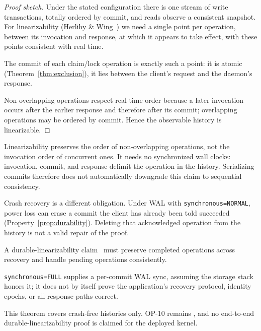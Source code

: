 \documentclass[11pt,a4paper]{article}
\theoremstyle{definition}
\theoremstyle{remark}
\begin{document}
\begin{proof}[Proof sketch]
\setlength{\parskip}{4pt plus 1pt}
Under the stated configuration there is one stream of write transactions, totally
ordered by commit, and reads observe a consistent snapshot. For linearizability
(Herlihy \& Wing~) we need a
single point per operation, between its invocation and response, at which it
appears to take effect, with these points consistent with real time.

The commit of
each claim/lock operation is exactly such a point: it is atomic
(Theorem~\ref{thm:exclusion}), it lies between the client's request and the
daemon's response.

Non-overlapping operations respect real-time order because a
later invocation occurs after the earlier response and therefore after its commit;
overlapping operations may be ordered by commit. Hence the observable history is
linearizable.
\end{proof}

\begin{pdboundary}
\setlength{\parskip}{4pt plus 1pt}
Linearizability preserves the order of non-overlapping operations, not the
invocation order of concurrent ones. It needs no synchronized wall clocks:
invocation, commit, and response delimit the operation in the history.
Serializing commits therefore does not automatically downgrade this claim to
sequential consistency.

Crash recovery is a different obligation. Under WAL with
\texttt{synchronous=NORMAL}, power loss can erase a commit the client has
already been told succeeded (Property~\ref{prop:durability}). Deleting that
acknowledged operation from the history is not a valid repair of the proof.

A durable-linearizability claim~ must preserve completed
operations across recovery and handle pending operations consistently.

\texttt{synchronous=FULL} supplies a per-commit WAL sync, assuming the storage
stack honors it; it does not by itself prove the application's recovery protocol,
identity epochs, or all response paths correct.

This theorem covers crash-free
histories only. OP-10 remains \Open, and no end-to-end durable-linearizability
proof is claimed for the deployed kernel.
\end{pdboundary}

\end{document}
